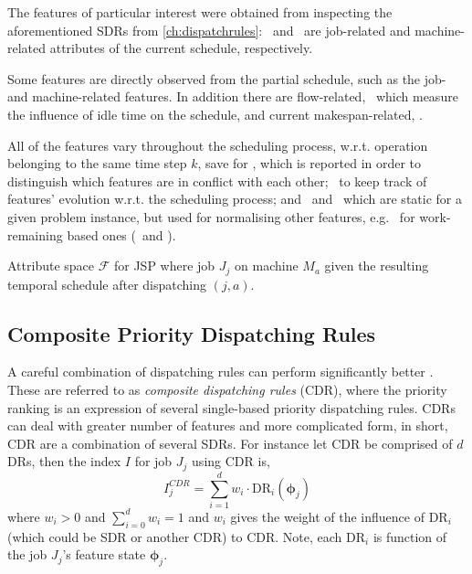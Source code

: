 \documentclass[smallextended]{svjour3}
\renewcommand{\vphi}{\bm \phi}
\begin{document}
	
	
	
	
	
	The features of particular interest were obtained from inspecting the aforementioned SDRs from \cref{ch:dispatchrules}:  
	\phiJobRelated\ and \phiMacRelated\ are job-related and machine-related attributes of the current schedule, respectively. 
	
	Some features are directly observed from the partial schedule, such as the job- and machine-related features. 
	In addition there are 
	flow-related, \phiFlowRelated\, which measure the influence of idle time on the schedule, 
	and current makespan-related, \phiScheduleRelated.
	
	All of the features vary throughout the scheduling process, w.r.t. operation belonging to the same time step $k$, save for \phimac, 
	which is reported in order to distinguish which features are in conflict with each other; \phistep\ to keep track of features' evolution w.r.t. the scheduling process; and \phitotalProc\ and \phiwrmTotal\ which are static for a given problem instance, but used for normalising other features, e.g. \phiwrmTotal\ for  work-remaining based ones (\phiwrmJob\ and \phiwrmMac). 
	
	\begin{table}[t]  \centering
		\caption[Attribute space $\mathcal{F}$ for JPS]{Attribute space $\mathcal{F}$ for JSP where job $J_j$ on machine $M_a$ given the resulting temporal schedule after dispatching $(j,a)$.
		}
		\label{tbl:jssp:feat}
		
	\end{table}
	
	\subsection{Composite Priority Dispatching Rules}\label{sec:CDR}
	A careful combination of dispatching rules can perform significantly better \cite{Jayamohan04}. These are referred to as \emph{composite dispatching rules} (CDR), where the priority ranking is an expression of several single-based priority dispatching rules. CDRs can deal with greater number of features and more complicated form, in short, CDR are a combination of several SDRs. For instance let CDR be comprised of $d$ DRs, then the index $I$ for job $J_j$ using CDR is, 
	\begin{equation}
	I_j^{CDR} = \sum_{i=1}^d w_i \cdot \text{DR}_i(\vphi_j) \label{eq:CDR}
	\end{equation}
	where $w_i>0$ and $\sum_{i=0}^d w_i = 1$ and $w_i$ gives the weight of the influence of $\text{DR}_i$ (which could be SDR or another CDR) to CDR. Note, each $\text{DR}_i$ is function of the job $J_j$'s feature state $\vphi_j$.
	
\end{document}
